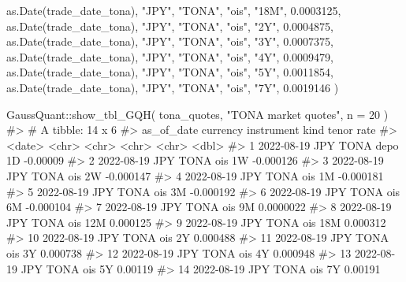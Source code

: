 \documentclass[
  letterpaper,
  DIV=11,
  numbers=noendperiod]{scrreprt}
\newenvironment{Shaded}{\begin{snugshade}}{\end{snugshade}}
\newcommand{\AttributeTok}[1]{\textcolor[rgb]{0.40,0.45,0.13}{#1}}
\newcommand{\CommentTok}[1]{\textcolor[rgb]{0.37,0.37,0.37}{#1}}
\newcommand{\DecValTok}[1]{\textcolor[rgb]{0.68,0.00,0.00}{#1}}
\newcommand{\FloatTok}[1]{\textcolor[rgb]{0.68,0.00,0.00}{#1}}
\newcommand{\FunctionTok}[1]{\textcolor[rgb]{0.28,0.35,0.67}{#1}}
\newcommand{\NormalTok}[1]{\textcolor[rgb]{0.00,0.23,0.31}{#1}}
\newcommand{\SpecialCharTok}[1]{\textcolor[rgb]{0.37,0.37,0.37}{#1}}
\newcommand{\StringTok}[1]{\textcolor[rgb]{0.13,0.47,0.30}{#1}}
\begin{document}
\begin{Shaded}
\begin{Highlighting}[]
  \FunctionTok{as.Date}\NormalTok{(trade\_date\_tona), }\StringTok{"JPY"}\NormalTok{, }\StringTok{"TONA"}\NormalTok{, }\StringTok{"ois"}\NormalTok{,  }\StringTok{"18M"}\NormalTok{,  }\FloatTok{0.0003125}\NormalTok{,}
  \FunctionTok{as.Date}\NormalTok{(trade\_date\_tona), }\StringTok{"JPY"}\NormalTok{, }\StringTok{"TONA"}\NormalTok{, }\StringTok{"ois"}\NormalTok{,  }\StringTok{"2Y"}\NormalTok{,   }\FloatTok{0.0004875}\NormalTok{,}
  \FunctionTok{as.Date}\NormalTok{(trade\_date\_tona), }\StringTok{"JPY"}\NormalTok{, }\StringTok{"TONA"}\NormalTok{, }\StringTok{"ois"}\NormalTok{,  }\StringTok{"3Y"}\NormalTok{,   }\FloatTok{0.0007375}\NormalTok{,}
  \FunctionTok{as.Date}\NormalTok{(trade\_date\_tona), }\StringTok{"JPY"}\NormalTok{, }\StringTok{"TONA"}\NormalTok{, }\StringTok{"ois"}\NormalTok{,  }\StringTok{"4Y"}\NormalTok{,   }\FloatTok{0.0009479}\NormalTok{,}
  \FunctionTok{as.Date}\NormalTok{(trade\_date\_tona), }\StringTok{"JPY"}\NormalTok{, }\StringTok{"TONA"}\NormalTok{, }\StringTok{"ois"}\NormalTok{,  }\StringTok{"5Y"}\NormalTok{,   }\FloatTok{0.0011854}\NormalTok{,}
  \FunctionTok{as.Date}\NormalTok{(trade\_date\_tona), }\StringTok{"JPY"}\NormalTok{, }\StringTok{"TONA"}\NormalTok{, }\StringTok{"ois"}\NormalTok{,  }\StringTok{"7Y"}\NormalTok{,   }\FloatTok{0.0019146}
\NormalTok{)}

\NormalTok{GaussQuant}\SpecialCharTok{::}\FunctionTok{show\_tbl\_GQH}\NormalTok{(}
\NormalTok{  tona\_quotes,}
  \StringTok{"TONA market quotes"}\NormalTok{,}
  \AttributeTok{n =} \DecValTok{20}
\NormalTok{)}
\CommentTok{\#\textgreater{} \# A tibble: 14 x 6}
\CommentTok{\#\textgreater{}    as\_of\_date currency instrument kind  tenor       rate}
\CommentTok{\#\textgreater{}    \textless{}date\textgreater{}     \textless{}chr\textgreater{}    \textless{}chr\textgreater{}      \textless{}chr\textgreater{} \textless{}chr\textgreater{}      \textless{}dbl\textgreater{}}
\CommentTok{\#\textgreater{}  1 2022{-}08{-}19 JPY      TONA       depo  1D    {-}0.00009  }
\CommentTok{\#\textgreater{}  2 2022{-}08{-}19 JPY      TONA       ois   1W    {-}0.000126 }
\CommentTok{\#\textgreater{}  3 2022{-}08{-}19 JPY      TONA       ois   2W    {-}0.000147 }
\CommentTok{\#\textgreater{}  4 2022{-}08{-}19 JPY      TONA       ois   1M    {-}0.000181 }
\CommentTok{\#\textgreater{}  5 2022{-}08{-}19 JPY      TONA       ois   3M    {-}0.000192 }
\CommentTok{\#\textgreater{}  6 2022{-}08{-}19 JPY      TONA       ois   6M    {-}0.000104 }
\CommentTok{\#\textgreater{}  7 2022{-}08{-}19 JPY      TONA       ois   9M     0.0000022}
\CommentTok{\#\textgreater{}  8 2022{-}08{-}19 JPY      TONA       ois   12M    0.000125 }
\CommentTok{\#\textgreater{}  9 2022{-}08{-}19 JPY      TONA       ois   18M    0.000312 }
\CommentTok{\#\textgreater{} 10 2022{-}08{-}19 JPY      TONA       ois   2Y     0.000488 }
\CommentTok{\#\textgreater{} 11 2022{-}08{-}19 JPY      TONA       ois   3Y     0.000738 }
\CommentTok{\#\textgreater{} 12 2022{-}08{-}19 JPY      TONA       ois   4Y     0.000948 }
\CommentTok{\#\textgreater{} 13 2022{-}08{-}19 JPY      TONA       ois   5Y     0.00119  }
\CommentTok{\#\textgreater{} 14 2022{-}08{-}19 JPY      TONA       ois   7Y     0.00191}
\end{Highlighting}
\end{Shaded}
\end{document}

